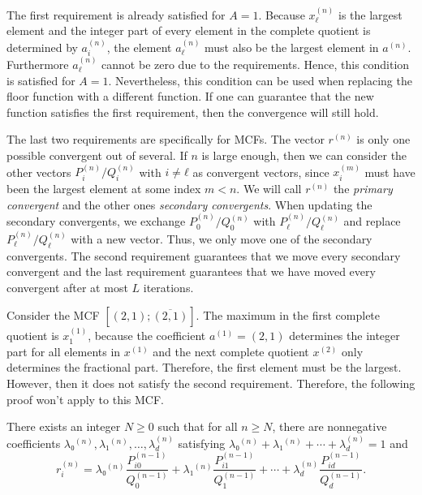 The first requirement is already satisfied for $A = 1$.
Because $x_ℓ^{(n)}$ is the largest element
and the integer part of every element in the complete quotient is determined by $a_i^{(n)}$,
the element $a_ℓ^{(n)}$ must also be the largest element in $a^{(n)}$.
Furthermore $a_ℓ^{(n)}$ cannot be zero due to the requirements.
Hence, this condition is satisfied for $A = 1$.
Nevertheless,
this condition can be used when replacing the floor function with a different function.
If one can guarantee that the new function satisfies the first requirement,
then the convergence will still hold.

The last two requirements are specifically for MCFs.
The vector $r^{(n)}$ is only one possible convergent out of several.
If $n$ is large enough, then we can consider the other vectors
$P_i^{(n)}/Q_i^{(n)}$ with $i ≠ ℓ$ as convergent vectors,
since $x_i^{(m)}$ must have been the largest element at some index $m < n$.
We will call $r^{(n)}$ the \emph{primary convergent} and the other ones
\emph{secondary convergents}.
When updating the secondary convergents,
we exchange $P_0^{(n)} / Q_0^{(n)}$ with $P_ℓ^{(n)}/Q_ℓ^{(n)}$
and replace  $P_ℓ^{(n)}/Q_ℓ^{(n)}$ with a new vector.
Thus, we only move one of the secondary convergents.
The second requirement guarantees that we move every secondary convergent
and the last requirement guarantees that we have moved every convergent after at most $L$ iterations.

\begin{example}
  Consider the MCF $[(2, 1); \overline{(2, 1)}]$.
  The maximum in the first complete quotient is $x^{(1)}_1$,
  because the coefficient $a^{(1)} = (2, 1)$ determines the integer part
  for all elements in $x^{(1)}$ and the next complete quotient $x^{(2)}$
  only determines the fractional part.
  Therefore, the first element must be the largest.
  However, then it does not satisfy the second requirement.
  Therefore, the following proof won't apply to this MCF.
\end{example}

\begin{lemma}
  \label{lem:conv-conv}
  There exists an integer $N ≥ 0$ such that for all $n ≥ N$,
  there are nonnegative coefficients $λ₀^{(n)}, λ₁^{(n)}, …, λ_d^{(n)}$
  satisfying $λ₀^{(n)} + λ₁^{(n)} + ⋯ + λ_d^{(n)} = 1$ and
  \[
    r_i^{(n)} = λ₀^{(n)} \frac{P_{i0}^{(n-1)}}{Q_0^{(n-1)}} + λ₁^{(n)} \frac{P_{i1}^{(n-1)}}{Q_1^{(n-1)}} + ⋯ + λ_d^{(n)} \frac{P_{id}^{(n-1)}}{Q_d^{(n-1)}}.
  \]
\end{lemma}

